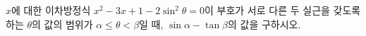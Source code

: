 $x$에 대한 이차방정식 $x^2-3x+1-2\sin^2\theta=0$이 부호가 서로 다른 두 실근을 갖도록 하는 $\theta$의 값의 범위가 $\alpha\le\theta<\beta$일 때, $\sin\alpha-\tan\beta$의 값을 구하시오. 
